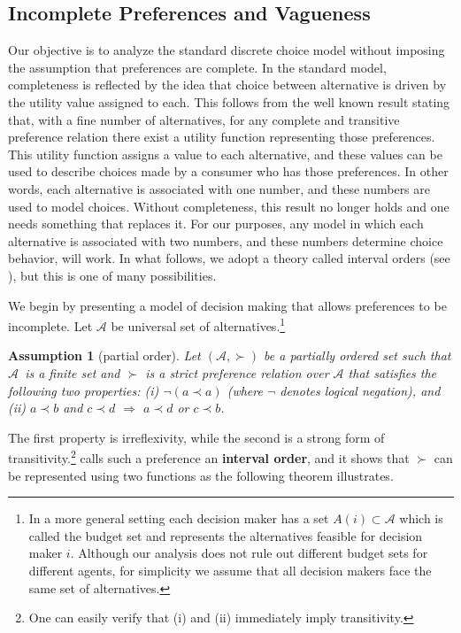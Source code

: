 \documentclass[reqno]{article}
\newtheorem{Assumption}{Assumption}
\renewcommand{\cite}{\citet}
\begin{document}
\subsection{Incomplete Preferences and Vagueness}
\label{Vagueness}
Our objective is to analyze the standard discrete choice model without
imposing the assumption that preferences are complete. In the standard
model, completeness is reflected by the idea that choice between alternative is driven by
the utility value assigned to each. This follows from the well
known result stating that, with a fine number of alternatives, for any complete and transitive
preference relation there exist a utility function representing those preferences. This utility function assigns a value to each alternative, and these values can be used to
describe choices made by a consumer who has those preferences. In other words, each alternative is associated with one number, and these numbers are used to model choices. Without completeness, this result no longer holds and one needs something that replaces it. For our purposes, any model in which each alternative is associated with two numbers, and these numbers determine choice behavior, will work. In what follows, we adopt a theory called interval orders (see \cite{Fishburn1970book}), but this is one of many possibilities.

We begin by presenting a model of decision making that allows preferences to be incomplete. Let $\mathcal{A}$ be universal set of alternatives.\footnote{%
In a more general setting each decision maker has a set $A(i)\subset \mathcal{A}
$ which is called the budget set and represents the alternatives feasible
for decision maker $i$. Although our analysis does not rule out different budget sets
for different agents, for simplicity we assume that all decision makers face the same set of alternatives.}

\begin{Assumption}[partial order]\label{alternatives} 
\label{intervalOrder} Let $\left( \mathcal{A},\succ \right)$ be a partially ordered set such that $\mathcal{A}$\ is a finite set and $\succ$ is a strict preference relation over $\mathcal{A}$ that satisfies the following two properties: (i) $\lnot \left( a\prec a\right) $ (where $\lnot $ denotes logical negation), and (ii) $a\prec b$ and $c\prec d$ 
$\Rightarrow $ $a\prec d$ or $c\prec b$.
\end{Assumption}

The first property is irreflexivity, while the second is a strong form of transitivity.\footnote{One can easily verify that (i) and (ii) immediately imply transitivity.} 
\cite{Fishburn1970book} calls such a preference an \textbf{interval order}, and it shows that $\succ$ can be represented using two functions as the following theorem illustrates.
\end{document}
